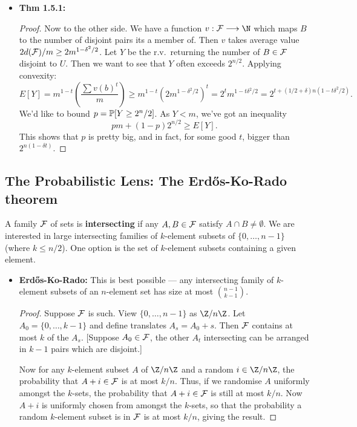 \documentclass[11pt]{article}
\newenvironment{INT}[1][]{\begin{itemize}\small\item\textbf{#1}}{\end{itemize}}
\begin{document}
\begin{chapter1}
\begin{itemise}
\begin{INT}[Thm 1.5.1:]
\begin{proof}
\INDENT Now to the other side. We have a function $v:\calF\to\N$ which maps $B$ to the number of disjoint pairs its a member of. Then $v$ takes average value $2d(\mathcal{F})/m\geq2m^{1-\delta^2/2}$. Let $Y$ be the r.v.\ returning the number of $B\in \mathcal{F}$ disjoint to $U$. Then we want to see that $Y$ often exceeds $2^{n/2}$. Applying convexity:
\[E[Y]=
m^{1-t}\left(\frac{\sum v(b)^t}{m}\right)\geq m^{1-t}\left(2m^{1-\delta^2/2}\right)^t=2^tm^{1-t\delta^2/2}=2^{t+(1/2+\delta)n(1-t\delta^2/2)}.\]
We'd like to bound $p=\operatorname{\mathbb{P}}[Y\geq 2^n/2]$. As $Y<m$, we've got an inequality
\[pm+(1-p)2^{n/2}\geq E[Y].\]
This shows that $p$ is pretty big, and in fact, for some good $t$, bigger than $2^{n(1-\delta t)}$.
\end{proof}
\end{INT}
\end{itemise}
\subsection*{The Probabilistic Lens: The Erd\H{o}s-Ko-Rado theorem}
A family $\mathcal{F}$ of sets is \textbf{intersecting} if any $A,B\in\mathcal{F}$ satisfy $A\cap B\neq\emptyset$. We are interested in large intersecting families of $k$-element subsets of $\{0,\ldots, n-1\}$ (where $k\leq n/2$). One option is the set of $k$-element subsets containing a given element.
\begin{INT}[Erd\H{o}s-Ko-Rado:]
This is best possible --- any intersecting family of $k$-element subsets of an $n$-element set has size at most ${n-1\choose k-1}$.
\begin{proof}
Suppose $\mathcal{F}$ is such. View $\{0,\ldots, n-1\}$ as $\Z/n\Z$. Let $A_0=\{0,\ldots,k-1\}$ and define translates $A_s=A_0+s$. Then $\mathcal{F}$ contains at most $k$ of the $A_s$. [Suppose $A_0\in\mathcal{F}$, the other $A_t$ intersecting can be arranged in $k-1$ pairs which are disjoint.]

Now for any $k$-element subset $A$ of $\Z/n\Z$ and a random $i\in \Z/n\Z$, the probability that $A+i\in\mathcal{F}$ is at most $k/n$. Thus, if we randomise $A$ uniformly amongst the $k$-sets, the probability that $A+i\in\mathcal{F}$ is still at most $k/n$. Now $A+i$ is uniformly chosen from amongst the $k$-sets, so that the probability a random $k$-element subset is in $\mathcal{F}$ is at most $k/n$, giving the result.
\end{proof}
\end{INT}
\end{chapter1}
\end{document}
